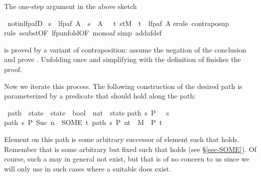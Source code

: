\begin{isabellebody}
\begin{isamarkuptext}
The one-step argument in the above sketch%
\end{isamarkuptext}%
\ not{\isacharunderscore}in{\isacharunderscore}lfp{\isacharunderscore}afD{\isacharcolon}\isanewline
\ {\isachardoublequote}s\ {\isasymnotin}\ lfp{\isacharparenleft}af\ A{\isacharparenright}\ {\isasymLongrightarrow}\ s\ {\isasymnotin}\ A\ {\isasymand}\ {\isacharparenleft}{\isasymexists}\ t{\isachardot}\ {\isacharparenleft}s{\isacharcomma}t{\isacharparenright}{\isasymin}M\ {\isasymand}\ t\ {\isasymnotin}\ lfp{\isacharparenleft}af\ A{\isacharparenright}{\isacharparenright}{\isachardoublequote}\isanewline
{}erule\ contrapos{\isacharunderscore}np{\isacharparenright}\isanewline
{}rule\ ssubst{\isacharbrackleft}OF\ lfp{\isacharunderscore}unfold{\isacharbrackleft}OF\ mono{\isacharunderscore}af{\isacharbrackright}{\isacharbrackright}{\isacharparenright}\isanewline
{}simp\ add{\isacharcolon}af{\isacharunderscore}def{\isacharparenright}\isanewline
{}%
\begin{isamarkuptext}%
\noindent
is proved by a variant of contraposition:
assume the negation of the conclusion and prove .
Unfolding  once and
simplifying with the definition of  finishes the proof.

Now we iterate this process. The following construction of the desired
path is parameterized by a predicate  that should hold along the path:%
\end{isamarkuptext}%
\ path\ {\isacharcolon}{\isacharcolon}\ {\isachardoublequote}state\ {\isasymRightarrow}\ {\isacharparenleft}state\ {\isasymRightarrow}\ bool{\isacharparenright}\ {\isasymRightarrow}\ {\isacharparenleft}nat\ {\isasymRightarrow}\ state{\isacharparenright}{\isachardoublequote}\isanewline
{}\isanewline
{\isachardoublequote}path\ s\ P\ {}\ {\isacharequal}\ s{\isachardoublequote}\isanewline
{\isachardoublequote}path\ s\ P\ {\isacharparenleft}Suc\ n{\isacharparenright}\ {\isacharequal}\ {\isacharparenleft}SOME\ t{\isachardot}\ {\isacharparenleft}path\ s\ P\ n{\isacharcomma}t{\isacharparenright}\ {\isasymin}\ M\ {\isasymand}\ P\ t{\isacharparenright}{\isachardoublequote}%
\begin{isamarkuptext}%
\noindent
Element  on this path is some arbitrary successor
 of element  such that  holds.  Remember that 
is some arbitrary but fixed  such that  holds (see \S\ref{sec-SOME}). Of
course, such a  may in general not exist, but that is of no
concern to us since we will only use  in such cases where a
suitable  does exist.


\end{isamarkuptext}
\end{isabellebody}
